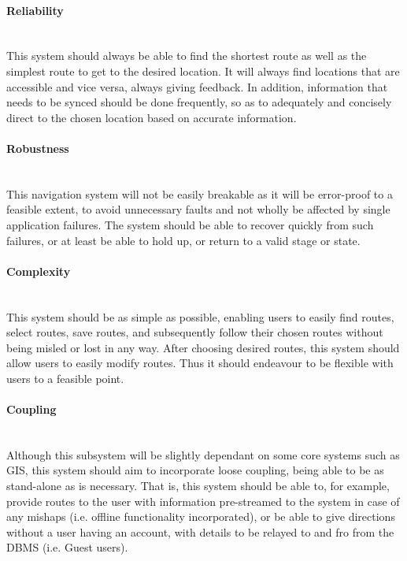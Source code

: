 	\paragraph{Reliability}
	\mbox{}\\
	This system should always be able to find the shortest route as well as the simplest route 
	to get to the desired location. It will always find locations that are accessible and vice 
	versa, always giving feedback. In addition, information that needs to be synced should be done
	frequently, so as to adequately and concisely direct to the chosen location based on accurate
	information. 
	
	\paragraph{Robustness}
	\mbox{}\\
	This navigation system will not be easily breakable as it will be error-proof to a feasible 
	extent, to avoid unnecessary faults and not wholly be affected by single application failures. 
	The system should be able to recover quickly from such failures, or at least be able to 
	hold up, or return to a valid stage or state.
	
	\paragraph{Complexity}
	\mbox{}\\
	This system should be as simple as possible, enabling users to easily find routes, select routes,
	save routes, and subsequently follow their chosen routes without being misled or lost in any way.  
	After choosing desired routes, this system should allow users to easily modify routes. Thus it should
	endeavour to be flexible with users to a feasible point.
	
	\paragraph{Coupling}
	\mbox{}\\
	Although this subsystem will be slightly dependant on some core systems such as GIS, this system
	should aim to incorporate loose coupling, being able to be as stand-alone as is necessary. 
	That is, this system should be able to, for example, provide routes to the user with information 
	pre-streamed to the system in case of any mishaps (i.e. offline functionality incorporated),
	or be able to give directions without a user having an account, with details to be relayed to and 
	fro from the DBMS (i.e. Guest users).
	
